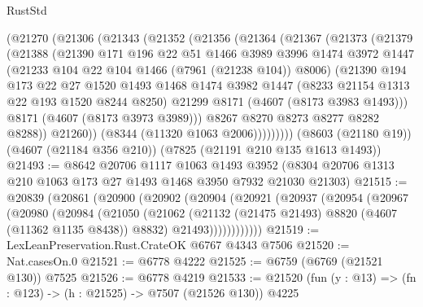\begin{lexlean}{RustStd}
\begin{coremodule}
      (@21270
        (@21306
          (@21343
            (@21352
              (@21356
                (@21364
                  (@21367
                    (@21373
                      (@21379
                        (@21388
                          (@21390
                            @171
                            @196
                            @22
                            @51
                            @1466
                            @3989
                            @3996
                            @1474
                            @3972
                            @1447
                            (@21233 @104 @22 @104 @1466 (@7961 (@21238 @104)) @8006)
                            (@21390
                              @194
                              @173
                              @22
                              @27
                              @1520
                              @1493
                              @1468
                              @1474
                              @3982
                              @1447
                              (@8233 @21154 @1313 @22 @193 @1520 @8244 @8250)
                              @21299
                              @8171
                              (@4607 (@8173 @3983 @1493)))
                            @8171
                            (@4607 (@8173 @3973 @3989)))
                          @8267
                          @8270
                          @8273
                          @8277
                          @8282
                          @8288))
                      @21260))
                  (@8344 (@11320 @1063 @2006)))))))))
    (@8603 (@21180 @19))
    (@4607 (@21184 @356 @210))
    (@7825 (@21191 @210 @135 @1613 @1493))
@21493 := @8642
    @20706
    @1117
    @1063
    @1493
    @3952
    (@8304 @20706 @1313 @210 @1063 @173 @27 @1493 @1468 @3950 @7932 @21030 @21303)
@21515 := @20839
    (@20861
      (@20900
        (@20902
          (@20904
            (@20921
              (@20937
                (@20954
                  (@20967
                    (@20980
                      (@20984
                        (@21050
                          (@21062
                            (@21132 (@21475 @21493) @8820 (@4607 (@11362 @1135 @8438)) @8832)
                            @21493))))))))))))
@21519 := LexLeanPreservation.Rust.CrateOK @6767 @4343 @7506
@21520 := Nat.casesOn.{0}
@21521 := @6778 @4222
@21525 := @6759 (@6769 (@21521 @130)) @7525
@21526 := @6778 @4219
@21533 := @21520 (fun (y : @13) => (fn : @123) -> (h : @21525) -> @7507 (@21526 @130)) @4225

\end{coremodule}
\end{lexlean}
